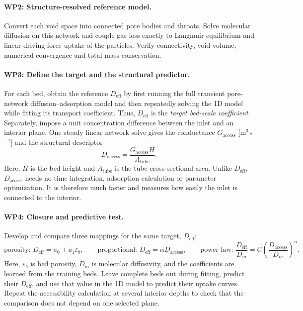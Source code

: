 \documentclass[10pt,a4paper]{article}
\begin{document}
\paragraph{WP2: Structure-resolved reference model.}
Convert each void space into connected pore bodies and throats. Solve molecular
diffusion on this network and couple gas loss exactly to Langmuir equilibrium
and linear-driving-force uptake of the particles. Verify connectivity, void
volume, numerical convergence and total mass conservation.

\paragraph{WP3: Define the target and the structural predictor.}
For each bed, obtain the reference $D_{\mathrm{eff}}$ by first running the full
transient pore-network diffusion--adsorption model and then repeatedly solving
the 1D model while fitting its transport coefficient. Thus,
$D_{\mathrm{eff}}$ is the \emph{target bed-scale coefficient}. Separately,
impose a unit concentration difference between the inlet and an interior plane.
One steady linear network solve gives the conductance
$G_{\mathrm{access}}$ [m$^3$\,s$^{-1}$] and the structural descriptor
\[
D_{\mathrm{access}}=\frac{G_{\mathrm{access}}H}{A_{\mathrm{tube}}}.
\]
Here, $H$ is the bed height and $A_{\mathrm{tube}}$ is the tube cross-sectional
area. Unlike $D_{\mathrm{eff}}$, $D_{\mathrm{access}}$ needs no time integration,
adsorption calculation or parameter optimization. It is therefore much faster
and measures how easily the inlet is connected to the interior.

\paragraph{WP4: Closure and predictive test.}
Develop and compare three mappings for the same target, $D_{\mathrm{eff}}$:
\[
\text{porosity: }D_{\mathrm{eff}}=a_0+a_1\varepsilon_b,\qquad
\text{proportional: }D_{\mathrm{eff}}=\alpha D_{\mathrm{access}},\qquad
\text{power law: }\frac{D_{\mathrm{eff}}}{D_m}
=C\left(\frac{D_{\mathrm{access}}}{D_m}\right)^n .
\]
Here, $\varepsilon_b$ is bed porosity, $D_m$ is molecular diffusivity, and the
coefficients are learned from the training beds. Leave complete beds out during
fitting, predict their $D_{\mathrm{eff}}$, and use that value in the 1D model to
predict their uptake curves. Repeat the accessibility calculation at several
interior depths to check that the comparison does not depend on one selected
plane.
\end{document}
